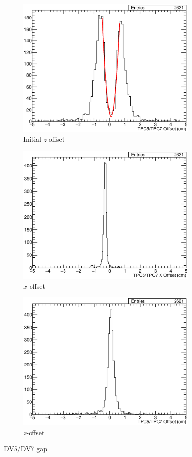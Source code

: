 \begin{figure}
  \centering
  \begin{subfigure}[t]{\linewidth}
    \centering
    \includegraphics[width=9cm]{TPC5TPC7GapFit.eps}
    \caption{Initial $z$-offset}
    \label{fig:AppendixTPC5TPC7Gap}
  \end{subfigure}
  \vfill
  \begin{subfigure}[t]{\linewidth}
    \centering
    \includegraphics[width=9cm]{TPC5TPC7XOff.eps}
    \caption{$x$-offset}
    \label{fig:AppendixTPC5TPC7XOff}
  \end{subfigure}
  \vfill
  \begin{subfigure}[t]{\linewidth}
    \centering
    \includegraphics[width=9cm]{TPC5TPC7ZOff.eps}
    \caption{$z$-offset}
    \label{fig:AppendixTPC5TPC7ZOff}
  \end{subfigure}
  \caption{DV5/DV7 gap.}
  \label{fig:AppendixTPC5TPC7}
\end{figure}
